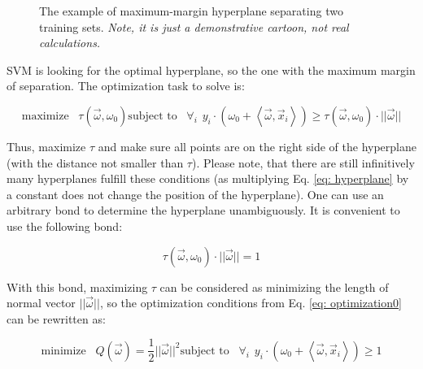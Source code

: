 \begin{figure}
 \centering
 \caption{The example of maximum-margin hyperplane separating two training sets. {\it Note, it is just a demonstrative cartoon, not real calculations.}}
 \label{fig: svmMargin}
\end{figure}

SVM is looking for the optimal hyperplane, so the one with the maximum margin of separation. The optimization task to solve is:

\begin{subequations}
 \begin{equation}
  \text{maximize}\hspace{10pt}\tau (\vec\omega, \omega_0)
 \end{equation}
 \begin{equation}
  \text{subject to}\hspace{10pt}\forall_i\hspace{5pt} y_i \cdot \left(\omega_0 + \left<\vec\omega, \vec x_i\right>\right) \geq \tau(\vec\omega, \omega_0)\cdot ||\vec\omega||
 \end{equation}
 \label{eq: optimization0}
\end{subequations}

Thus, maximize $\tau$ and make sure all points are on the right side of the hyperplane (with the distance not smaller than $\tau$). Please note, that there are still infinitively many hyperplanes fulfill these conditions (as multiplying Eq. \ref{eq: hyperplane} by a constant does not change the position of the hyperplane). One can use an arbitrary bond to determine the hyperplane unambiguously. It is convenient to use the following bond:

\begin{equation}
 \tau(\vec\omega, \omega_0)\cdot ||\vec\omega|| = 1
\end{equation}

With this bond, maximizing $\tau$ can be considered as minimizing the length of normal vector $||\vec\omega||$, so the optimization conditions from Eq. \ref{eq: optimization0} can be rewritten as:

\begin{subequations}
 \begin{equation}
  \text{minimize}\hspace{10pt} Q(\vec\omega) = \frac{1}{2}||\vec\omega||^2
  \label{eq: maximize}
 \end{equation}
 \begin{equation}
  \text{subject to}\hspace{10pt}\forall_i\hspace{5pt} y_i \cdot \left(\omega_0 + \left<\vec\omega, \vec x_i\right>\right) \geq 1
  \label{eq: condition}
 \end{equation}
 \label{eq: optimization}
\end{subequations}

